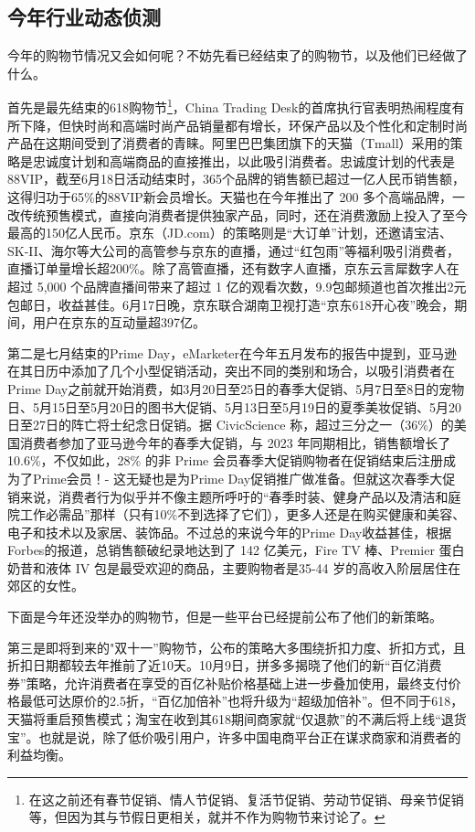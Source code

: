 \documentclass[12pt]{ctexart}
\begin{document}
\subsection{今年行业动态侦测}
今年的购物节情况又会如何呢？不妨先看已经结束了的购物节，以及他们已经做了什么。

首先是最先结束的618购物节\footnote{在这之前还有春节促销、情人节促销、复活节促销、劳动节促销、母亲节促销等，但因为其与节假日更相关，就并不作为购物节来讨论了。}，China Trading Desk的首席执行官表明热闹程度有所下降，但快时尚和高端时尚产品销量都有增长，环保产品以及个性化和定制时尚产品在这期间受到了消费者的青睐\cite{23}。阿里巴巴集团旗下的天猫（Tmall）采用的策略是忠诚度计划和高端商品的直接推出，以此吸引消费者。忠诚度计划的代表是88VIP，截至6月18日活动结束时，365个品牌的销售额已超过一亿人民币销售额，这得归功于65\%的88VIP新会员增长\cite{23}。天猫也在今年推出了 200 多个高端品牌，一改传统预售模式，直接向消费者提供独家产品，同时，还在消费激励上投入了至今最高的150亿人民币。京东（JD.com）的策略则是“大订单”计划，还邀请宝洁、SK-II、海尔等大公司的高管参与京东的直播，通过“红包雨”等福利吸引消费者，直播订单量增长超200\%。除了高管直播，还有数字人直播，京东云言犀数字人在超过 5,000 个品牌直播间带来了超过 1 亿的观看次数，9.9包邮频道也首次推出2元包邮日\cite{24}，收益甚佳。6月17日晚，京东联合湖南卫视打造“京东618开心夜”晚会，期间，用户在京东的互动量超397亿\cite{24}。

第二是七月结束的Prime Day，eMarketer在今年五月发布的报告\cite{25}中提到，亚马逊在其日历中添加了几个小型促销活动，突出不同的类别和场合，以吸引消费者在Prime Day之前就开始消费，如3月20日至25日的春季大促销、5月7日至8日的宠物日、5月15日至5月20日的图书大促销、5月13日至5月19日的夏季美妆促销、5月20日至27日的阵亡将士纪念日促销。据 CivicScience 称，超过三分之一（36\%）的美国消费者参加了亚马逊今年的春季大促销，与 2023 年同期相比，销售额增长了 10.6\%，不仅如此，28\% 的非 Prime 会员春季大促销购物者在促销结束后注册成为了Prime会员！- 这无疑也是为Prime Day促销推广做准备。但就这次春季大促销来说，消费者行为似乎并不像主题所呼吁的“春季时装、健身产品以及清洁和庭院工作必需品”那样（只有10\%不到选择了它们），更多人还是在购买健康和美容、电子和技术以及家居、装饰品。不过总的来说今年的Prime Day收益甚佳，根据Forbes的报道，总销售额破纪录地达到了 142 亿美元，Fire TV 棒、Premier 蛋白奶昔和液体 IV 包是最受欢迎的商品，主要购物者是35-44 岁的高收入阶层居住在郊区的女性\cite{26}。

下面是今年还没举办的购物节，但是一些平台已经提前公布了他们的新策略。

第三是即将到来的"双十一”购物节，公布的策略大多围绕折扣力度、折扣方式，且折扣日期都较去年推前了近10天。10月9日，拼多多揭晓了他们的新“百亿消费券”策略，允许消费者在享受的百亿补贴价格基础上进一步叠加使用，最终支付价格最低可达原价的2.5折，“百亿加倍补”也将升级为“超级加倍补”\cite{27}。但不同于618，天猫将重启预售模式；淘宝在收到其618期间商家就“仅退款”的不满后将上线“退货宝”\cite{28}。也就是说，除了低价吸引用户，许多中国电商平台正在谋求商家和消费者的利益均衡。
\end{document}
